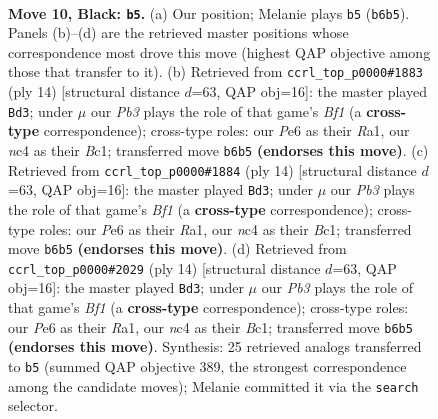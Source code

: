 \documentclass[11pt]{article}
\begin{document}
\clearpage

\begin{figure}[p]\centering
\begin{subfigure}{0.46\textwidth}\centering
\resizebox{\linewidth}{!}{%
\newchessgame
\chessboard[
  setfen={rnbqr1k1/p1p1bppp/1p2p3/3n4/2NP4/3Q1BP1/PP2PP1P/RNB2RK1 b - - 1 10},
  showmover=false,
  pgfstyle=straightmove, color=movearrow, markmove={b6-b5}
]}
\caption{}
\end{subfigure}\hfill
\begin{subfigure}{0.46\textwidth}\centering
\resizebox{\linewidth}{!}{%
\newchessgame
\chessboard[
  setfen={rn1qkb1r/pbp2ppp/1p2pn2/8/3P4/P1N1PN2/1P3PPP/R1BQKB1R w KQkq - 1 8},
  showmover=false,
  pgfstyle=straightmove, color=movearrow, markmove={f1-d3}
]}
\caption{}
\end{subfigure}
\\[4pt]
\begin{subfigure}{0.46\textwidth}\centering
\resizebox{\linewidth}{!}{%
\newchessgame
\chessboard[
  setfen={rn1qkb1r/pbp2ppp/1p2pn2/8/3P4/P1N1PN2/1P3PPP/R1BQKB1R w KQkq - 1 8},
  showmover=false,
  pgfstyle=straightmove, color=movearrow, markmove={f1-d3}
]}
\caption{}
\end{subfigure}\hfill
\begin{subfigure}{0.46\textwidth}\centering
\resizebox{\linewidth}{!}{%
\newchessgame
\chessboard[
  setfen={rn1qkb1r/pbp2ppp/1p2pn2/8/3P4/P1N1PN2/1P3PPP/R1BQKB1R w KQkq - 1 8},
  showmover=false,
  pgfstyle=straightmove, color=movearrow, markmove={f1-d3}
]}
\caption{}
\end{subfigure}
\caption{\textbf{Move 10, Black: \texttt{b5}.} (a) Our position; Melanie plays \texttt{b5} (\texttt{b6b5}). Panels (b)--(d) are the retrieved master positions whose correspondence most drove this move (highest QAP objective among those that transfer to it). (b) Retrieved from \texttt{ccrl\_top\_p0000\#1883} (ply 14) [structural distance $d$=63, QAP obj=16]: the master played \texttt{Bd3}; under $\mu$ our \emph{Pb3} plays the role of that game's \emph{Bf1} (a \textbf{cross-type} correspondence); cross-type roles: our \emph{P}e6 as their \emph{R}a1, our \emph{n}c4 as their \emph{B}c1; transferred move \texttt{b6b5} \textbf{(endorses this move)}. (c) Retrieved from \texttt{ccrl\_top\_p0000\#1884} (ply 14) [structural distance $d$=63, QAP obj=16]: the master played \texttt{Bd3}; under $\mu$ our \emph{Pb3} plays the role of that game's \emph{Bf1} (a \textbf{cross-type} correspondence); cross-type roles: our \emph{P}e6 as their \emph{R}a1, our \emph{n}c4 as their \emph{B}c1; transferred move \texttt{b6b5} \textbf{(endorses this move)}. (d) Retrieved from \texttt{ccrl\_top\_p0000\#2029} (ply 14) [structural distance $d$=63, QAP obj=16]: the master played \texttt{Bd3}; under $\mu$ our \emph{Pb3} plays the role of that game's \emph{Bf1} (a \textbf{cross-type} correspondence); cross-type roles: our \emph{P}e6 as their \emph{R}a1, our \emph{n}c4 as their \emph{B}c1; transferred move \texttt{b6b5} \textbf{(endorses this move)}. Synthesis: 25 retrieved analogs transferred to \texttt{b5} (summed QAP objective 389, the strongest correspondence among the candidate moves); Melanie committed it via the \texttt{search} selector.}
\label{fig:thought-m19}
\end{figure}
\end{document}
